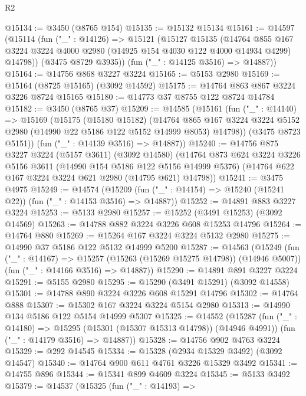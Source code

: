 \begin{lexlean}{R2}
\begin{coremodule}
@15134 := @3450 (@8765 @154)
@15135 := @15132 @15134
@15161 := @14597
    (@15114
      (fun ("_" : @14126) =>
      @15121
        (@15127
          @15135
          (@14764
            @855
            @167
            @3224
            @3224
            @4000
            @2980
            (@14925 @154 @4030 @122 @4000 @14934 @4299)
            @14798))
        (@3475 @8729 @3935))
      (fun ("_" : @14125 @3516) => @14887))
@15164 := @14756 @868 @3227 @3224
@15165 := @5153 @2980
@15169 := @15164 (@8725 @15165) (@3092 @14592)
@15175 := @14764 @863 @867 @3224 @3226 @8724 @15165
@15180 := @14773 @37 @8755 @122 @8724 @14784
@15182 := @3450 (@8765 @37)
@15209 := @14585
    (@15161
      (fun ("_" : @14140) =>
      @15169
        (@15175
          (@15180 @15182)
          (@14764
            @865
            @167
            @3224
            @3224
            @5152
            @2980
            (@14990 @22 @5186 @122 @5152 @14999 @8053)
            @14798))
        (@3475 @8723 @5151))
      (fun ("_" : @14139 @3516) => @14887))
@15240 := @14756
    @875
    @3227
    @3224
    (@5157 @3611)
    (@3092 @14580)
    (@14764
      @873
      @624
      @3224
      @3226
      @5156
      @3611
      (@14990 @154 @5186 @122 @5156 @14999 @5376)
      (@14764 @622 @167 @3224 @3224 @621 @2980 (@14795 @621) @14798))
@15241 := @3475 @4975
@15249 := @14574
    (@15209 (fun ("_" : @14154) => @15240 (@15241 @22)) (fun ("_" : @14153 @3516) => @14887))
@15252 := @14891 @883 @3227 @3224
@15253 := @5133 @2980
@15257 := @15252 (@3491 @15253) (@3092 @14569)
@15263 := @14788 @882 @3224 @3226 @608 @15253 @14796
@15264 := @14764 @880
@15269 := @15264 @167 @3224 @3224 @5132 @2980
@15275 := @14990 @37 @5186 @122 @5132 @14999 @5200
@15287 := @14563
    (@15249
      (fun ("_" : @14167) => @15257 (@15263 (@15269 @15275 @14798)) (@14946 @5007))
      (fun ("_" : @14166 @3516) => @14887))
@15290 := @14891 @891 @3227 @3224
@15291 := @5155 @2980
@15295 := @15290 (@3491 @15291) (@3092 @14558)
@15301 := @14788 @890 @3224 @3226 @608 @15291 @14796
@15302 := @14764 @888
@15307 := @15302 @167 @3224 @3224 @5154 @2980
@15313 := @14990 @134 @5186 @122 @5154 @14999 @5307
@15325 := @14552
    (@15287
      (fun ("_" : @14180) => @15295 (@15301 (@15307 @15313 @14798)) (@14946 @4991))
      (fun ("_" : @14179 @3516) => @14887))
@15328 := @14756 @902 @4763 @3224
@15329 := @292 @14545
@15334 := @15328 (@2934 @15329 @3492) (@3092 @14547)
@15340 := @14764 @900 @611 @4761 @3226 @15329 @3492
@15341 := @14755 @896
@15344 := @15341 @899 @4609 @3224
@15345 := @5133 @3492
@15379 := @14537
    (@15325
      (fun ("_" : @14193) =>

\end{coremodule}
\end{lexlean}
